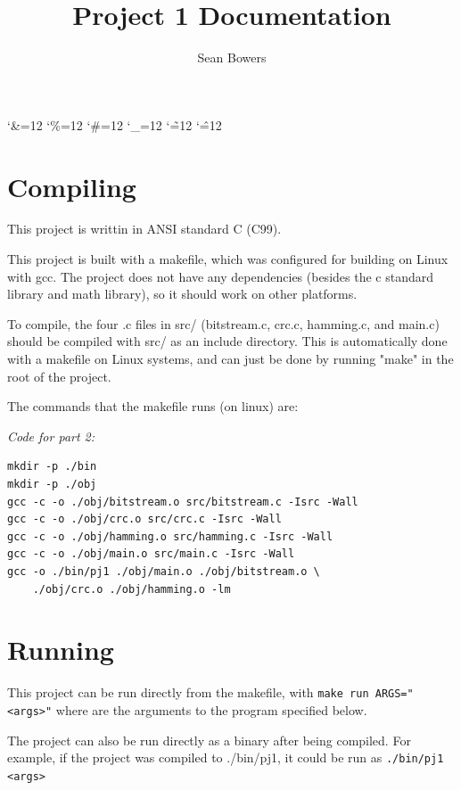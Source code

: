 \documentclass[12pt]{article}
\begin{document}
    \catcode`\&=12
    \catcode`\%=12
    \catcode`\#=12
    \catcode`\_=12
    \catcode`\~=12
    \catcode`\^=12

    \title{Project 1 Documentation}
    \author{Sean Bowers}
    \maketitle

    \section*{Compiling}

    This project is writtin in ANSI standard C (C99).

    This project is built with a makefile, which was configured for building on Linux with gcc.
    The project does not have any dependencies (besides the c standard library and math library), so it should work on other platforms.

    To compile, the four .c files in src/ (bitstream.c, crc.c, hamming.c, and main.c) should be compiled with src/ as an include directory.
    This is automatically done with a makefile on Linux systems, and can just be done by running "make" in the root of the project.

    The commands that the makefile runs (on linux) are:

    \textit{Code for part 2:}
    \begin{snugshade*}
    \begin{verbatim}
mkdir -p ./bin
mkdir -p ./obj
gcc -c -o ./obj/bitstream.o src/bitstream.c -Isrc -Wall
gcc -c -o ./obj/crc.o src/crc.c -Isrc -Wall
gcc -c -o ./obj/hamming.o src/hamming.c -Isrc -Wall
gcc -c -o ./obj/main.o src/main.c -Isrc -Wall
gcc -o ./bin/pj1 ./obj/main.o ./obj/bitstream.o \
    ./obj/crc.o ./obj/hamming.o -lm
    \end{verbatim}
    \end{snugshade*}

    \section*{Running}

    This project can be run directly from the makefile, with \verb|make run ARGS="<args>"| where are the arguments to the program specified below.

    The project can also be run directly as a binary after being compiled.
    For example, if the project was compiled to ./bin/pj1, it could be run as \verb|./bin/pj1 <args>|
\end{document}
